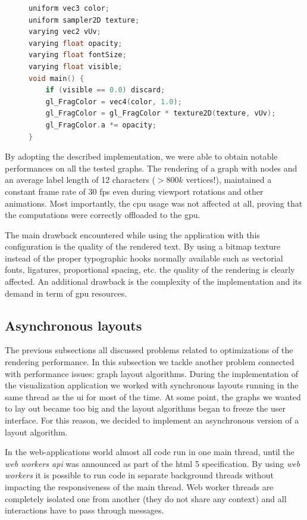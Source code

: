 \begin{figure}
\begin{lstlisting}[caption={Fragment shader to paint each face with the correct character.},label=lst:label-fragment,language=c]
uniform vec3 color;
uniform sampler2D texture;
varying vec2 vUv;
varying float opacity;
varying float fontSize;
varying float visible;
void main() {
    if (visible == 0.0) discard;
    gl_FragColor = vec4(color, 1.0);
    gl_FragColor = gl_FragColor * texture2D(texture, vUv);
    gl_FragColor.a *= opacity;
}
\end{lstlisting}
\end{figure}

By adopting the described implementation, we were able to obtain notable performances on all the tested graphs. The rendering of a graph with  nodes and an average label length of 12 characters ($>800k$ vertices!), maintained a constant frame rate of 30 fps even during viewport rotations and other animations. Most importantly, the \gls{cpu} usage was not affected at all, proving that the computations were correctly offloaded to the \gls{gpu}.

The main drawback encountered while using the application with this configuration is the quality of the rendered text. By using a bitmap texture instead of the proper typographic hooks normally available such as vectorial fonts, ligatures, proportional spacing, etc. the quality of the rendering is clearly affected. An additional drawback is the complexity of the implementation and its demand in term of \gls{gpu} resources.

\subsection{Asynchronous layouts}

The previous subsections all discussed problems related to optimizations of the rendering performance. In this subsection we tackle another problem connected with performance issues: graph layout algorithms. During the implementation of the visualization application we worked with synchronous layouts running in the same thread as the \gls{ui} for most of the time. At some point, the graphs we wanted to lay out became too big and the layout algorithms began to freeze the user interface. For this reason, we decided to implement an asynchronous version of a layout algorithm.

In the web-applications world almost all code run in one main thread, until the \emph{web workers \gls{api}} was announced as part of the \gls{html} 5 specification. By using \emph{web workers} it is possible to run code in separate background threads without impacting the responsiveness of the main thread. Web worker threads are completely isolated one from another (they do not share any context) and all interactions have to pass through messages.

